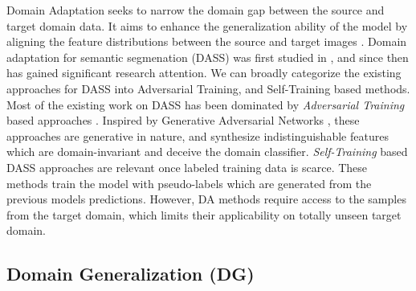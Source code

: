 \documentclass[10pt,twocolumn,letterpaper]{article}
\begin{document}
Domain Adaptation seeks to narrow the domain gap between the source and target domain data. It aims to enhance the generalization ability of the model by aligning the feature distributions between the source and target images \cite{ganin2015unsupervised,ganin2016domain,long2015learning,long2016unsupervised,sohn2017unsupervised,tzeng2015simultaneous,tzeng2017adversarial}. Domain adaptation for semantic segmenation (DASS) was first studied in  \cite{hoffman2016fcns,zhang2017curriculum}, and since then has gained significant research attention. We can broadly categorize the existing approaches for DASS into Adversarial Training, and Self-Training based methods.
Most of the existing work on DASS has been dominated by \textit{Adversarial Training} based approaches \cite{ganin2015unsupervised,hoffman2018cycada,chen2018road,sankaranarayanan2018learning,zhang2018fully}. Inspired by Generative Adversarial Networks \cite{goodfellow2020generative}, these approaches are generative in nature, and synthesize indistinguishable features which are domain-invariant and deceive the domain classifier.
\textit{Self-Training} based DASS approaches are relevant once labeled training data is scarce. These methods \cite{zou2018unsupervised, li2019bidirectional} train the model with pseudo-labels which are generated from the previous models predictions. 
However, DA methods require access to the samples from the target domain, which limits their applicability on totally unseen target domain.










\subsection{Domain Generalization (DG)}
\end{document}
